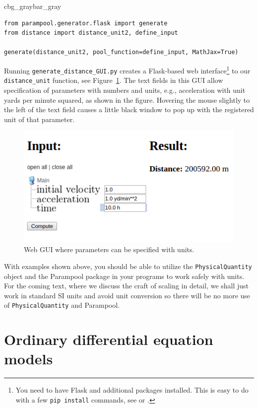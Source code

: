 \documentclass[graybox,envcountchap,sectrefs,final]{svmonodo}
\newenvironment{_pro_tight}[2]{
   \def\FrameCommand{\color{#2}\vrule width 1mm\normalcolor\colorbox{#1}}
   \FrameRule0.6pt\MakeFramed {\advance\hsize-2mm\FrameRestore}\vskip3mm}
   {\vskip0mm\endMakeFramed}
\newenvironment{pro}[2]{
\bgroup\rmfamily
\fboxsep=0mm\relax
\begin{_pro_tight}{#1}{#2}
\list{}{\parsep=-2mm\parskip=0mm\topsep=0pt\leftmargin=2mm
\rightmargin=2\leftmargin\leftmargin=4pt\relax}
\item\relax}
{\endlist\end{_pro_tight}\egroup}
\begin{document}
\begin{pro}{cbg_gray}{bar_gray}\begin{Verbatim}[numbers=none,fontsize=\fontsize{9pt}{9pt},baselinestretch=0.95,xleftmargin=2mm]
from parampool.generator.flask import generate
from distance import distance_unit2, define_input

generate(distance_unit2, pool_function=define_input, MathJax=True)
\end{Verbatim}
\end{pro}
\noindent
Running \Verb!generate_distance_GUI.py! creates a Flask-based web
interface\footnote{You need to have Flask and additional packages installed. This is easy to do with a few \texttt{pip install} commands, see \cite{parampool} or \cite{web4sciapps}.}
to our \Verb!distance_unit! function, see Figure~\ref{scale:dimunit:fig:GUI}.
The text fields in this GUI allow specification of parameters with
numbers and units, e.g., acceleration with unit yards per minute squared,
as shown in the figure. Hovering the mouse slightly to the left of
the text field causes a little black window to pop up with the registered unit
of that parameter.





\begin{figure}[!ht]  %
  \centerline{\includegraphics[width=0.5\linewidth]{fig-scaling/distance_GUI.png}}
  \caption{
  Web GUI where parameters can be specified with units. \label{scale:dimunit:fig:GUI}
  }
\end{figure}


With examples shown above, you should be able to utilize the
\texttt{PhysicalQuantity} object and the Parampool package in your programs
to work safely with units. For the coming text, where we discuss the
craft of scaling in detail, we shall just work in standard SI units
and avoid unit conversion so there will be no more use of
\texttt{PhysicalQuantity} and Parampool.


\chapter{Ordinary differential equation models}
\end{document}

